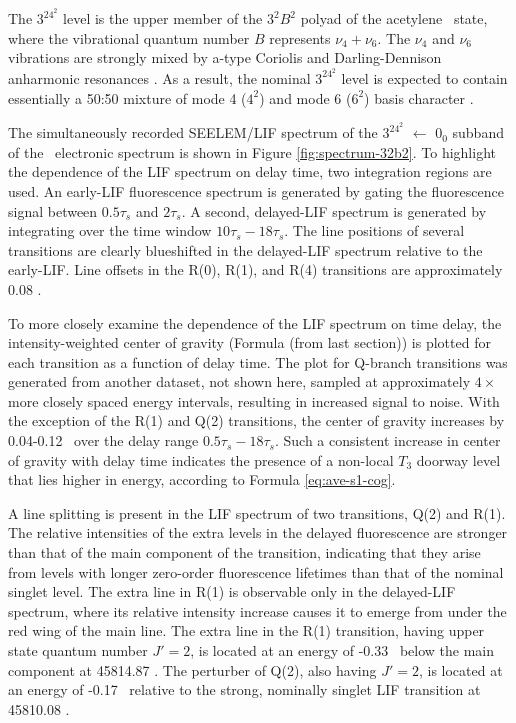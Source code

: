 \documentclass[12pt]{mitthesis}
\begin{document}
The $3^24^2$ level is the upper member of the $3^2B^2$ polyad of the
acetylene \astate\ state, where the vibrational quantum number $B$
represents $\nu_4 + \nu_6$.  The $\nu_4$ and $\nu_6$ vibrations are
strongly mixed by a-type Coriolis and Darling-Dennison anharmonic
resonances \cite{merer08}.  As a result, the nominal $3^24^2$ level is
expected to contain essentially a 50:50 mixture of mode 4 ($4^2$) and
mode 6 ($6^2$) basis character \cite{merer08, virgo07}.

The simultaneously recorded SEELEM/LIF spectrum of the $3^24^2$ 
$\leftarrow$ $0_0$ subband of the \AtoX\ electronic spectrum is shown
in Figure \ref{fig:spectrum-32b2}. To highlight the dependence of the
LIF spectrum on delay time, two integration regions are used.  An
early-LIF fluorescence spectrum is generated by gating the
fluorescence signal between $0.5\tau_s$ and $2\tau_s$.  A second,
delayed-LIF spectrum is generated by integrating over the time window
$10\tau_s-18\tau_s$.  The line positions of several transitions are
clearly blueshifted in the delayed-LIF spectrum relative to the
early-LIF.  Line offsets in the R(0), R(1), and R(4) transitions are
approximately 0.08 \rcm.

To more closely examine the dependence of the LIF spectrum on time
delay, the intensity-weighted center of gravity (Formula (from last
section)) is plotted for each transition as a function of delay time.
The plot for Q-branch transitions was generated from another dataset,
not shown here, sampled at approximately $4 \times$ more closely
spaced energy intervals, resulting in increased signal to noise.  With
the exception of the R(1) and Q(2) transitions, the center of gravity
increases by 0.04-0.12 \rcm\ over the delay range
$0.5\tau_s-18\tau_s$.  Such a consistent increase in center of gravity
with delay time indicates the presence of a non-local $T_3$ doorway
level that lies higher in energy, according to Formula
\ref{eq:ave-s1-cog}.


A line splitting is present in the LIF spectrum of two transitions,
Q(2) and R(1).  The relative intensities of the extra levels in the
delayed fluorescence are stronger than that of the main component of
the transition, indicating that they arise from levels with longer
zero-order fluorescence lifetimes than that of the nominal singlet
level.  The extra line in R(1) is observable only in the delayed-LIF
spectrum, where its relative intensity increase causes it to emerge
from under the red wing of the main line.  The extra line in the R(1)
transition, having upper state quantum number $J'=2$, is located at an
energy of -0.33 \rcm\ below the main component at 45814.87 \rcm.  The
perturber of Q(2), also having $J'=2$, is located at an energy of
-0.17 \rcm\ relative to the strong, nominally singlet LIF transition
at 45810.08 \rcm.
\end{document}
